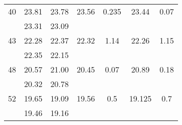 \begin{table}[]
\begin{tabular}{S[table-format=2.0] S[table-format=2.2] S[table-format=2.2]  S S S S}
            40 & 23.81 &  23.78 &   23.56  & 0.235      &  23.44  & 0.07  \\
               & 23.31 &  23.09 &          &            &         &       \\
            43 & 22.28 &  22.37 &   22.32  & 1.14       &  22.26  & 1.15  \\
               & 22.35 &  22.15 &          &            &         &       \\
            48 & 20.57 &  21.00 &   20.45  & 0.07       &  20.89  & 0.18  \\
               & 20.32 &  20.78 &          &            &         &       \\
            52 & 19.65 &  19.09 &   19.56  & 0.5        &  19.125 & 0.7   \\
               & 19.46 &  19.16 &          &            &         &       \\
        \bottomrule  
    \end{tabular}
\end{table}


